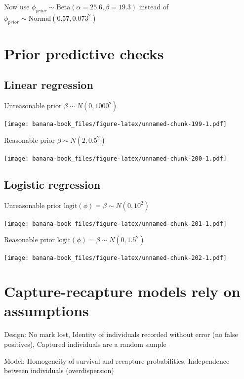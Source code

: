 \documentclass[
  12pt,
]{krantz}
\begin{document}
Now use \(\phi_{prior} \sim \text{Beta}(\alpha = 25.6,\beta = 19.3)\) instead of \(\phi_{prior} \sim \text{Normal}(0.57,0.073^2)\)

\hypertarget{prior-predictive-checks}{%
\section{Prior predictive checks}\label{prior-predictive-checks}}

\hypertarget{linear-regression}{%
\subsection{Linear regression}\label{linear-regression}}

Unreasonable prior \(\beta \sim N(0, 1000^2)\)

\texttt{[image: banana-book\_files/figure-latex/unnamed-chunk-199-1.pdf]}

Reasonable prior \(\beta \sim N(2, 0.5^2)\)

\texttt{[image: banana-book\_files/figure-latex/unnamed-chunk-200-1.pdf]}

\hypertarget{logistic-regression}{%
\subsection{Logistic regression}\label{logistic-regression}}

Unreasonable prior \(\text{logit}(\phi) = \beta \sim N(0, 10^2)\)

\texttt{[image: banana-book\_files/figure-latex/unnamed-chunk-201-1.pdf]}

Reasonable prior \(\text{logit}(\phi) = \beta \sim N(0, 1.5^2)\)

\texttt{[image: banana-book\_files/figure-latex/unnamed-chunk-202-1.pdf]}

\hypertarget{capture-recapture-models-rely-on-assumptions}{%
\section{Capture-recapture models rely on assumptions}\label{capture-recapture-models-rely-on-assumptions}}

Design: No mark lost, Identity of individuals recorded without error (no false positives), Captured individuals are a random sample

Model: Homogeneity of survival and recapture probabilities, Independence between individuals (overdispersion)
\end{document}
